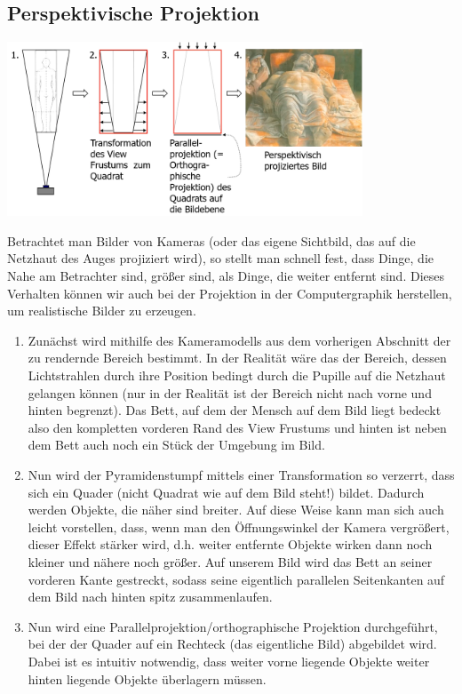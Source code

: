 \subsection{Perspektivische Projektion}

\includegraphics[width=400px]{images/perspektivischeProjektion.png}

\vspace{10px}

Betrachtet man Bilder von Kameras (oder das eigene Sichtbild, das auf die Netzhaut des Auges projiziert wird), so stellt man schnell fest, dass Dinge, die Nahe am Betrachter sind, größer sind, als Dinge, die weiter entfernt sind. Dieses Verhalten können wir auch bei der Projektion in der Computergraphik herstellen, um realistische Bilder zu erzeugen.\\
\begin{enumerate}
    \item Zunächst wird mithilfe des Kameramodells aus dem vorherigen Abschnitt der zu rendernde Bereich bestimmt. In der Realität wäre das der Bereich, dessen Lichtstrahlen durch ihre Position bedingt durch die Pupille auf die Netzhaut gelangen können (nur in der Realität ist der Bereich nicht nach vorne und hinten begrenzt). Das Bett, auf dem der Mensch auf dem Bild liegt bedeckt also den kompletten vorderen Rand des View Frustums und hinten ist neben dem Bett auch noch ein Stück der Umgebung im Bild.
    \item Nun wird der Pyramidenstumpf mittels einer Transformation so verzerrt, dass sich ein Quader (nicht Quadrat wie auf dem Bild steht!) bildet. Dadurch werden Objekte, die näher sind breiter. Auf diese Weise kann man sich auch leicht vorstellen, dass, wenn man den Öffnungswinkel der Kamera vergrößert, dieser Effekt stärker wird, d.h. weiter entfernte Objekte wirken dann noch kleiner und nähere noch größer. Auf unserem Bild wird das Bett an seiner vorderen Kante gestreckt, sodass seine eigentlich parallelen Seitenkanten auf dem Bild nach hinten spitz zusammenlaufen.
    \item Nun wird eine Parallelprojektion/orthographische Projektion durchgeführt, bei der der Quader auf ein Rechteck (das eigentliche Bild) abgebildet wird. Dabei ist es intuitiv notwendig, dass weiter vorne liegende Objekte weiter hinten liegende Objekte überlagern müssen.
\end{enumerate}

